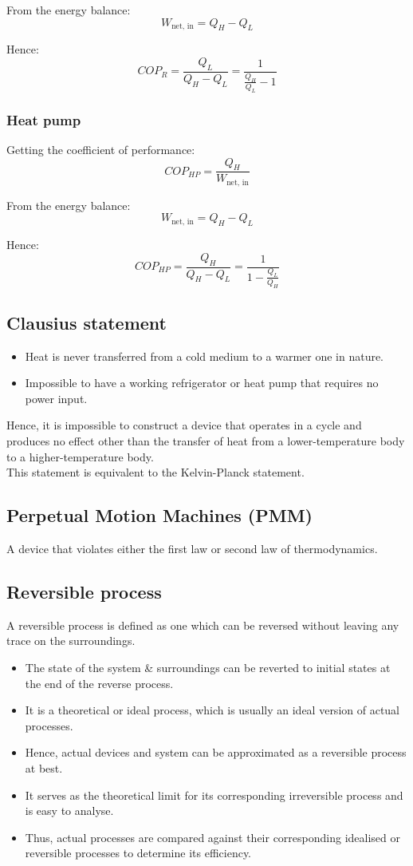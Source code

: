 \documentclass[11pt]{article}
\begin{document}
From the energy balance:
\[W_{\text{net, in}} = Q_H - Q_L\]

Hence:
\[COP_R = \frac{Q_L}{Q_H - Q_L} = \frac{1}{\frac{Q_H}{Q_L} - 1}\]

\subsubsection{Heat pump}
\label{sec:orgc218ec6}
Getting the coefficient of performance:
\[COP_{HP} = \frac{Q_H}{W_{\text{net, in}}}\]

From the energy balance:
\[W_{\text{net, in}} = Q_H - Q_L\]

Hence:
\[COP_{HP} = \frac{Q_H}{Q_H - Q_L} = \frac{1}{1 - \frac{Q_L}{Q_H}}\]

\subsection{Clausius statement}
\label{sec:org2b7c5e9}
\begin{itemize}
\item Heat is never transferred from a cold medium to a warmer one in nature.
\item Impossible to have a working refrigerator or heat pump that requires no power input.
\end{itemize}

Hence, it is impossible to construct a device that operates in a cycle and produces no effect other than the transfer of heat from a lower-temperature body to a higher-temperature body.
\\[0pt]

This statement is equivalent to the Kelvin-Planck statement.

\subsection{Perpetual Motion Machines (PMM)}
\label{sec:orgfc3e512}
A device that violates either the first law or second law of thermodynamics.

\subsection{Reversible process}
\label{sec:org950e776}
A reversible process is defined as one which can be reversed without leaving any trace on the surroundings.
\begin{itemize}
\item The state of the system \& surroundings can be reverted to initial states at the end of the reverse process.
\item It is a theoretical or ideal process, which is usually an ideal version of actual processes.
\item Hence, actual devices and system can be approximated as a reversible process at best.
\item It serves as the theoretical limit for its corresponding irreversible process and is easy to analyse.
\item Thus, actual processes are compared against their corresponding idealised or reversible processes to determine its efficiency.
\end{itemize}
\end{document}
